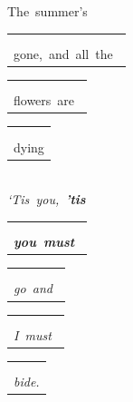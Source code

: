 \documentclass[12pt,a5paper,openany]{memoir}
\begin{document}
The~summer’s~\begin{tabular}[b]{l}
    \textbf{\sffamily\color{red}{D}}\\
    \textbf{\sffamily\color{red}\color{blue}{IV}}\\gone,~and~all~the~\mbox{}\end{tabular}\begin{tabular}[b]{l}
    \small{\sffamily\color{LightRed}{D7}}\\
    \small{\sffamily\color{LightRed}\color{blue}{IV7}}\\flowers~are~\mbox{}\end{tabular}\begin{tabular}[b]{l}
    \textbf{\sffamily\color{red}{G}}\\
    \textbf{\sffamily\color{red}\color{blue}{VIIb}}\\dying\mbox{}\end{tabular}\\
\emph{‘Tis~you,~\textbf{’tis~}}\begin{tabular}[b]{l}
    \textbf{\sffamily\color{red}{D}}\\
    \textbf{\sffamily\color{red}\color{blue}{IV}}\\\emph{\textbf{you~must}~}\mbox{}\end{tabular}\begin{tabular}[b]{l}
    \textbf{\sffamily\color{red}{Em}}\\
    \textbf{\sffamily\color{red}\color{blue}{Vm}}\\\emph{go~and~}\mbox{}\end{tabular}\begin{tabular}[b]{l}
    \textbf{\sffamily\color{red}{A7}}\\
    \textbf{\sffamily\color{red}\color{blue}{I7}}\\\emph{I~must~}\mbox{}\end{tabular}\begin{tabular}[b]{l}
    \textbf{\sffamily\color{red}{D}}\\
    \textbf{\sffamily\color{red}\color{blue}{IV}}\\\emph{bide.}\mbox{}\end{tabular}

    \vspace{\parskip}
\end{document}

